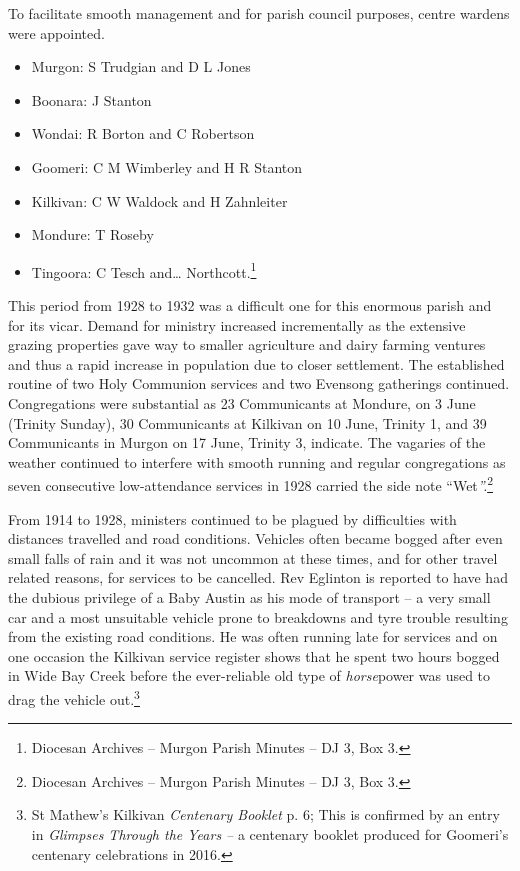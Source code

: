 To facilitate smooth management and for parish council purposes, centre
wardens were appointed.

\begin{itemize}
\item
  Murgon: S Trudgian and D L Jones
\item
  Boonara: J Stanton
\item
  Wondai: R Borton and C Robertson
\item
  Goomeri: C M Wimberley and H R Stanton
\item
  Kilkivan: C W Waldock and H Zahnleiter
\item
  Mondure: T Roseby
\item
  Tingoora: C Tesch and\ldots{} Northcott.\footnote{Diocesan Archives --
    Murgon Parish Minutes -- DJ 3, Box 3.}
\end{itemize}

This period from 1928 to 1932 was a difficult one for this enormous
parish and for its vicar. Demand for ministry increased incrementally as
the extensive grazing properties gave way to smaller agriculture and
dairy farming ventures and thus a rapid increase in population due to
closer settlement. The established routine of two Holy Communion
services and two Evensong gatherings continued. Congregations were
substantial as 23 Communicants at Mondure, on 3 June (Trinity Sunday),
30 Communicants at Kilkivan on 10 June, Trinity 1, and 39 Communicants
in Murgon on 17 June, Trinity 3, indicate. The vagaries of the weather
continued to interfere with smooth running and regular congregations as
seven consecutive low-attendance services in 1928 carried the side note
``Wet\emph{''.}\footnote{Diocesan Archives -- Murgon Parish Minutes --
  DJ 3, Box 3.}

From 1914 to 1928, ministers continued to be plagued by difficulties
with distances travelled and road conditions. Vehicles often became
bogged after even small falls of rain and it was not uncommon at these
times, and for other travel related reasons, for services to be
cancelled. Rev Eglinton is reported to have had the dubious privilege of
a Baby Austin as his mode of transport -- a very small car and a most
unsuitable vehicle prone to breakdowns and tyre trouble resulting from
the existing road conditions. He was often running late for services and
on one occasion the Kilkivan service register shows that he spent two
hours bogged in Wide Bay Creek before the ever-reliable old type of
\emph{horse}power was used to drag the vehicle out.\footnote{St Mathew's
  Kilkivan \emph{Centenary Booklet} p. 6; This is confirmed by an entry
  in \emph{Glimpses Through the Years --} a centenary booklet produced
  for Goomeri's centenary celebrations in 2016.}




